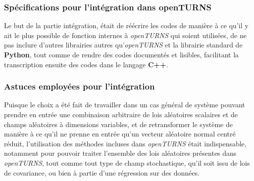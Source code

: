 \documentclass[a4paper,10pt]{article}
\begin{document}
\subsubsection{Spécifications pour l'intégration dans openTURNS}
Le but de la partie intégration, était de réécrire les codes de manière à ce qu'il y ait le plus possible de fonction internes à \textit{openTURNS} qui soient utilisées, de ne pas inclure d'autres librairies autres qu'\textit{openTURNS} et la librairie standard de \textbf{Python}, tout comme de rendre des codes documentés et lisibles, facilitant la transcription ensuite des codes dans le langage \textbf{C++}.

\subsubsection{Astuces employées pour l'intégration}
Puisque le choix a été fait de travailler dans un cas général de système pouvant prendre en entrée une combinaison arbitraire de lois aléatoires scalaires et de champs aléatoires à dimensions variables, et de retransformer le système de manière à ce qu'il ne prenne en entrée qu'un vecteur aléatoire normal centré réduit, l'utilisation des méthodes incluses dans \textit{openTURNS} était indispensable, notamment pour pouvoir traiter l’ensemble des lois aléatoires présentes dans \textit{openTURNS}, tout comme tout type de champ stochastique, qu'il soit issu de lois de covariance, ou bien à partie d'une régression sur des données.
\end{document}
